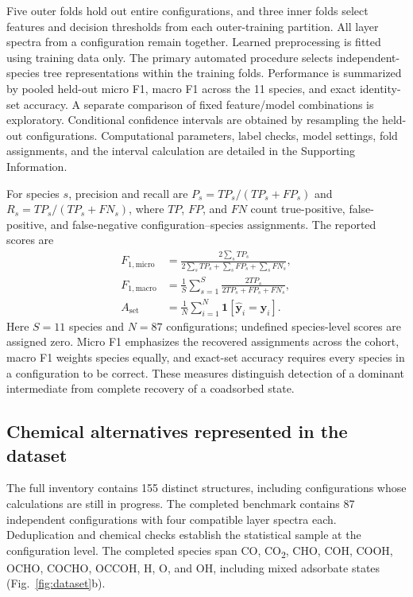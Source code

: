 \documentclass[11pt,a4paper]{article}
\newcommand{\co}{CO\textsubscript{2}}
\begin{document}
Five outer folds hold out entire configurations, and three inner folds select features and decision thresholds from each outer-training partition. All layer spectra from a configuration remain together. Learned preprocessing is fitted using training data only. The primary automated procedure selects independent-species tree representations within the training folds. Performance is summarized by pooled held-out micro F1, macro F1 across the 11 species, and exact identity-set accuracy. A separate comparison of fixed feature/model combinations is exploratory. Conditional confidence intervals are obtained by resampling the held-out configurations. Computational parameters, label checks, model settings, fold assignments, and the interval calculation are detailed in the Supporting Information.

For species $s$, precision and recall are $P_s=TP_s/(TP_s+FP_s)$ and $R_s=TP_s/(TP_s+FN_s)$, where $TP$, $FP$, and $FN$ count true-positive, false-positive, and false-negative configuration--species assignments. The reported scores are
\begin{align}
F_{1,\mathrm{micro}}&=\frac{2\sum_s TP_s}{2\sum_s TP_s+\sum_s FP_s+\sum_s FN_s},\\
F_{1,\mathrm{macro}}&=\frac{1}{S}\sum_{s=1}^{S}\frac{2TP_s}{2TP_s+FP_s+FN_s},\\
A_{\mathrm{set}}&=\frac{1}{N}\sum_{i=1}^{N}\mathbf{1}\!\left[\widehat{\boldsymbol y}_i=\boldsymbol y_i\right].
\end{align}
Here $S=11$ species and $N=87$ configurations; undefined species-level scores are assigned zero. Micro F1 emphasizes the recovered assignments across the cohort, macro F1 weights species equally, and exact-set accuracy requires every species in a configuration to be correct. These measures distinguish detection of a dominant intermediate from complete recovery of a coadsorbed state.

\subsection{Chemical alternatives represented in the dataset}
The full inventory contains 155 distinct structures, including configurations whose calculations are still in progress. The completed benchmark contains 87 independent configurations with four compatible layer spectra each. Deduplication and chemical checks establish the statistical sample at the configuration level. The completed species span CO, \co{}, CHO, COH, COOH, OCHO, COCHO, OCCOH, H, O, and OH, including mixed adsorbate states (Fig.~\ref{fig:dataset}b).
\end{document}
